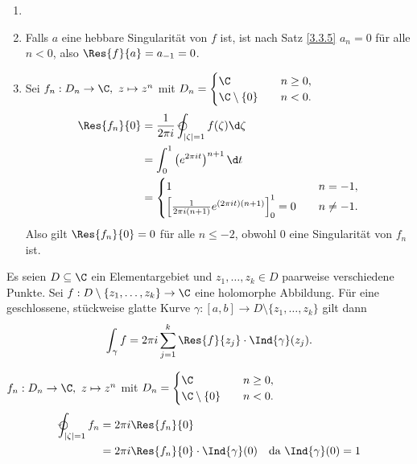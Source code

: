 		\begin{exmp*}
			\begin{enumerate}[label={\alph*})]
				\item[]
				\item Falls $a$ eine hebbare Singularität von $f$ ist, ist nach Satz \ref{3.3.5} $a_n = 0$ für alle $n < 0$, also $\Res{f}{a} = a_{-1} = 0$.
				\item Sei $ f_n : D_n \to \C,\ z \mapsto z^n $ mit $ D_n = \begin{cases}
				\C \quad &n \geq 0,\\
				\C \setminus\{0\} \quad &n<0.
				\end{cases} $
				\begin{align*}
					\Res{f_n}{0} &= \frac{1}{2\pi i} \varointctrclockwise_{|\zeta| = 1} f(\zeta)\d\zeta\\
					&= \int_0^1 \left(e^{2\pi it}\right)^{n+1}\d t\\
					&= \begin{cases}
					1 \quad &n = -1,\\
					\left[ \frac{1}{2\pi i(n+1)} e^{(2\pi it)(n+1)} \right]_0^1 = 0 \quad &n \neq -1.
					\end{cases}
				\end{align*}
				Also gilt $ \Res{f_n}{0} = 0 $ für alle $n \leq -2$, obwohl $0$ eine Singularität von $f_n$ ist.
			\end{enumerate}
		\end{exmp*}
		
		\begin{thmn}\label{3.4.4}
			Es seien $ D \subseteq \C $ ein Elementargebiet und $z_1,\dotsc,z_k \in D$ paarweise verschiedene Punkte. Sei $ f: D \setminus\{z_1,\dotsc,z_k\} \to \C $ eine holomorphe Abbildung. Für eine geschlossene, stückweise glatte Kurve $\gamma: [a,b] \to D \setminus\{z_1,\dotsc,z_k\}$ gilt dann
			\[ \int_\gamma f = 2\pi i \sum_{j=1}^k \Res{f}{z_j} \cdot \Ind{\gamma}(z_j). \]
		\end{thmn}
		
		\begin{exmp*}
			$ f_n : D_n \to \C,\ z \mapsto z^n $ mit $ D_n = \begin{cases}
			\C \quad &n \geq 0,\\
			\C \setminus\{0\} \quad &n<0.
			\end{cases} $
			\begin{align*}
				\varointctrclockwise_{|\zeta| = 1} f_n &= 2\pi i \Res{f_n}{0}\\
				&= 2\pi i \Res{f_n}{0} \cdot \Ind{\gamma}(0) \quad \text{da } \Ind{\gamma}(0)=1
			\end{align*}
		\end{exmp*}
		
